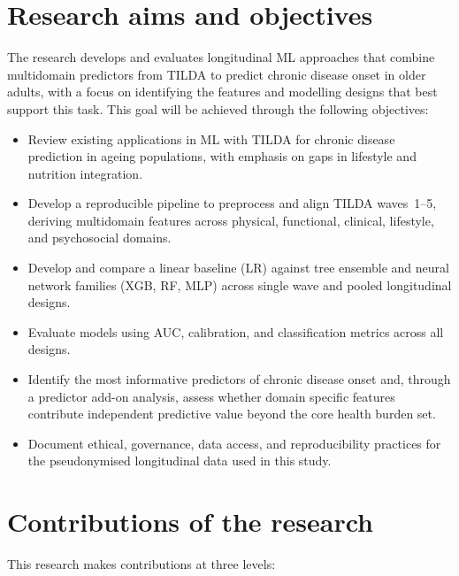 \section{Research aims and objectives}
The research develops and evaluates longitudinal \gls{ML} approaches that combine multidomain predictors from \gls{TILDA} to predict chronic disease onset in older adults, with a focus on identifying the features and modelling designs that best support this task. This goal will be achieved through the following objectives:
\begin{itemize}
  \item[-] Review existing applications in \gls{ML} with \gls{TILDA} for chronic disease prediction in ageing populations, with emphasis on gaps in lifestyle and nutrition integration.
  \item[-] Develop a reproducible pipeline to preprocess and align \gls{TILDA} waves~1--5, deriving multidomain features across physical, functional, clinical, lifestyle, and psychosocial domains.
  \item[-] Develop and compare a linear baseline (\gls{LR}) against tree ensemble and neural network families (\gls{XGB}, \gls{RF}, \gls{MLP}) across single wave and pooled longitudinal designs.
  \item[-] Evaluate models using \gls{AUC}, calibration, and classification metrics across all designs.
  \item[-] Identify the most informative predictors of chronic disease onset and, through a predictor add-on analysis, assess whether domain specific features contribute independent predictive value beyond the core health burden set.
  \item[-] Document ethical, governance, data access, and reproducibility practices for the pseudonymised longitudinal data used in this study.
\end{itemize}

\section{Contributions of the research}\label{sc:contributions}
This research makes contributions at three levels:

